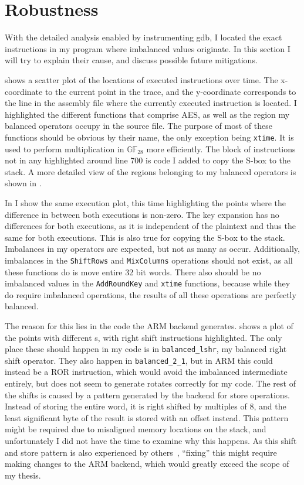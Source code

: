 \section{Robustness}
With the detailed analysis enabled by instrumenting gdb, I located the exact instructions in my program where imbalanced values originate.
In this section I will try to explain their cause, and discuss possible future mitigations.

 shows a scatter plot of the locations of executed instructions over time.
The x-coordinate to the current point in the trace, and the y-coordinate corresponds to the line in the assembly file where the currently executed instruction is located.
I highlighted the different functions that comprise AES, as well as the region my balanced operators occupy in the source file.
The purpose of most of these functions should be obvious by their name, the only exception being \texttt{xtime}.
It is used to perform multiplication in $\mathbb{GF}_{28}$ more efficiently.
The block of instructions not in any highlighted around line 700 is code I added to copy the S-box to the stack.
A more detailed view of the regions belonging to my balanced operators is shown in .

In  I show the same execution plot, this time highlighting the points where the difference in \hammingw{} between both executions is non-zero.
The key expansion has no differences for both executions, as it is independent of the plaintext and thus the same for both executions.
This is also true for copying the S-box to the stack.
Imbalances in my operators are expected, but not as many as occur.
Additionally, imbalances in the \texttt{ShiftRows} and \texttt{MixColumns} operations should not exist, as all these functions do is move entire 32 bit words.
There also should be no imbalanced values in the \texttt{AddRoundKey} and \texttt{xtime} functions, because while they do require imbalanced operations, the results of all these operations are perfectly balanced.

The reason for this lies in the code the ARM backend generates.
 shows a plot of the points with different \hammingw{}s, with right shift instructions highlighted.
The only place these should happen in my code is in \texttt{balanced\_lshr}, my balanced right shift operator.
They also happen in \texttt{balanced\_2\_1}, but in ARM this could instead be a ROR instruction, which would avoid the imbalanced intermediate entirely, but \llvm{} does not seem to generate rotates correctly for my code.
The rest of the shifts is caused by a pattern generated by the backend for store operations.
Instead of storing the entire word, it is right shifted by multiples of 8, and the least significant byte of the result is stored with an offset instead.
This pattern might be required due to misaligned memory locations on the stack, and unfortunately I did not have the time to examine why this happens.
As this shift and store pattern is also experienced by others~\cite{simon2018you}, ``fixing'' this might require making changes to the \llvm{} ARM backend, which would greatly exceed the scope of my thesis.


